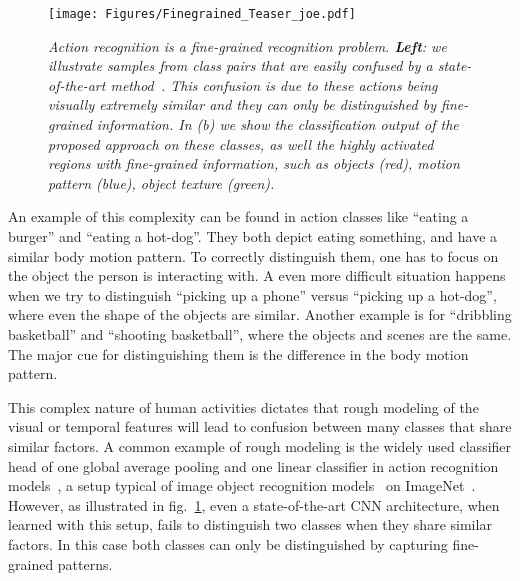 \documentclass[10pt,twocolumn,letterpaper]{article}
\begin{document}
\begin{figure}
    \begin{center}
    \texttt{[image: Figures/Finegrained\_Teaser\_joe.pdf]}
    \end{center}
    \caption{\it Action recognition is a fine-grained recognition problem. \textbf{Left}: we illustrate samples from class pairs that are easily confused by a state-of-the-art method~\cite{Inflated3D_CVPR17}. This confusion is due to these actions being visually extremely similar and they can only be distinguished by fine-grained information. In (b) we show the classification output of the proposed approach on these classes, as well the highly activated regions with fine-grained information, such as objects (red), motion pattern (blue), object texture (green).\vspace{-2mm}}\vspace{-2mm}
    \label{fig:teaser}
\end{figure}


An example of this complexity can be found in action classes like ``eating a burger'' and ``eating a hot-dog''. They both depict eating something, and have a similar body motion pattern. To correctly distinguish them, one has to focus on the object the person is interacting with. A even more difficult situation happens when we try to distinguish ``picking up a phone'' versus ``picking up a hot-dog'', where even the shape of the objects are similar.
Another example is for ``dribbling basketball'' and ``shooting basketball'', where the objects and scenes are the same. The major cue for distinguishing them is the difference in the body motion pattern.


This complex nature of human activities dictates that rough modeling of the visual or temporal features will lead to confusion between many classes that share similar factors.
A common example of rough modeling is the widely used classifier head of one global average pooling and one linear classifier in action recognition models~\cite{Inflated3D_CVPR17,TSN_TPAMI18}, a setup typical of image object recognition models~\cite{Resnet_CVPR16} on ImageNet~\cite{ImageNet_CVPR09}.
However, as illustrated in fig.~\ref{fig:teaser}, even a state-of-the-art CNN architecture, when learned with this setup, fails to distinguish two classes when they share similar factors. In this case both classes can only be distinguished by capturing fine-grained patterns.
\end{document}
